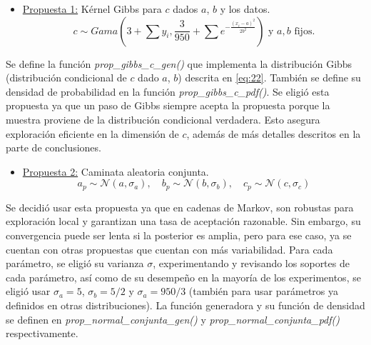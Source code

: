 \begin{itemize}
	\item \underline{Propuesta 1:} 	Kérnel Gibbs para $c$ dados $a$, $b$ y los datos.
	\begin{equation} \label{eq:24}
		c\sim Gama\left(3+\sum y_i, \frac{3}{950} + \sum e^{- \frac{(x_i -a)^2}{2b^2}}\right) \text{ y } a, b \text{ fijos.}
	\end{equation}
\end{itemize}
Se define la función \textit{prop\_gibbs\_c\_gen()} que implementa la distribución Gibbs (distribución condicional de $c$ dado $a$, $b$) descrita en \eqref{eq:22}. También se define su densidad de probabilidad en la función \textit{prop\_gibbs\_c\_pdf()}. Se eligió esta propuesta ya que un paso de Gibbs siempre acepta la propuesta porque la muestra proviene de la distribución condicional verdadera. Esto asegura exploración eficiente en la dimensión de $c$, además de más detalles descritos en la parte de conclusiones.

\begin{itemize}
	\item \underline{Propuesta 2:} 	Caminata aleatoria conjunta.
	\begin{equation} \label{eq:25}
		a_p\sim \mathcal{N} (a, \sigma_a),\quad b_p\sim \mathcal{N} (b, \sigma_b),\quad c_p\sim \mathcal{N} (c, \sigma_c)
	\end{equation}
\end{itemize}
Se decidió usar esta propuesta ya que en cadenas de Markov, son robustas para exploración local y garantizan una tasa de aceptación razonable. Sin embargo, su convergencia puede ser lenta si la posterior es amplia, pero para ese caso, ya se cuentan con otras propuestas que cuentan con más variabilidad. Para cada parámetro, se eligió su varianza $\sigma$, experimentando y revisando los soportes de cada parámetro, así como de su desempeño en la mayoría de los experimentos, se eligió usar $\sigma_a = 5$, $\sigma_b = 5/2$ y $\sigma_a = 950/3$ (también para usar parámetros ya definidos en otras distribuciones). La función generadora y su función de densidad se definen en \textit{prop\_normal\_conjunta\_gen()} y \textit{prop\_normal\_conjunta\_pdf()} respectivamente.

